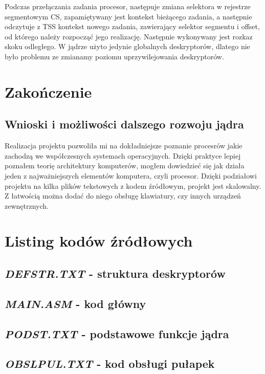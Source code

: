 \documentclass[a4paper,12pt]{article}
\begin{document}
Podczas przełączania zadania procesor, następuje zmiana selektora w rejestrze segmentowym CS, zapamiętywany jest kontekst bieżącego zadania, a następnie odczytuje z TSS kontekst nowego zadania, zawierający selektor segmentu i offset, od którego należy rozpocząć jego realizację.  Następnie wykonywany jest rozkaz skoku odległego. W jądrze użyto jedynie globalnych deskryptorów, dlatego nie było problemu ze zmianamy poziomu uprzywilejowania deskryptorów. 

	\section{Zakończenie}
\subsection{Wnioski i możliwości dalszego rozwoju jądra}
Realizacja projektu pozwoliła mi na dokładniejsze poznanie procesrów jakie zachodzą we współczesnych systemach operacyjnych. Dzięki praktyce lepiej poznałem teorię architektury komputerów, mogłem dowiedzieć się jak działa jeden z najważniejszych elementów komputera, czyli procesor. Dzięki podziałowi projektu na kilka plików tekstowych z kodem źródłowym, projekt jest skalowalny. Z łatwością można dodać do niego obsługę klawiatury, czy innych urządzeń zewnętrznych.

\section{Listing kodów źródłowych}


\subsection{\textit{DEFSTR.TXT} - struktura deskryptorów}


\subsection{\textit{MAIN.ASM} - kod główny}


\subsection{\textit{PODST.TXT} - podstawowe funkcje jądra}


\subsection{\textit{OBSLPUL.TXT} - kod obsługi pułapek}

\end{document}
